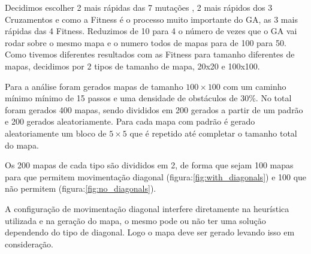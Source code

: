 Decidimos escolher 2 mais rápidas das 7 mutações , 2 mais rápidos dos 3 Cruzamentos e como a Fitness é o processo muito importante do GA, as 3 mais rápidas das 4 Fitness. Reduzimos de 10 para 4 o número de vezes que o GA vai rodar sobre o mesmo mapa e o numero todos de mapas para de 100 para 50.
Como tivemos diferentes resultados com as Fitness para tamanho diferentes de mapas, decidimos por 2 tipos de tamanho de mapa, 20x20 e 100x100.



Para a análise foram gerados mapas de tamanho  $100\times 100$  com um caminho mínimo mínimo de 15 passos e uma densidade de obstáculos de 30\%.
No total foram gerados 400 mapas, sendo divididos em 200 gerados a partir de um padrão e 200 gerados aleatoriamente. Para cada mapa com padrão é gerado aleatoriamente um bloco de $5\times 5$ que é repetido até completar o tamanho total do mapa.
 
Os 200 mapas de cada tipo são divididos em 2, de forma que sejam 100 mapas para que permitem movimentação diagonal (figura:\ref{fig:with_diagonals}) e 100 que não permitem (figura:\ref{fig:no_diagonals}).
 
A configuração de movimentação diagonal interfere diretamente na heurística utilizada e na geração do mapa, o mesmo pode ou não ter uma solução dependendo do tipo de diagonal. Logo o mapa deve ser gerado levando isso em consideração.
 
\begin{minipage}{\linewidth}
 	\label{fig:no_diagonals}
\end{minipage}
 
